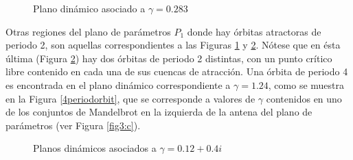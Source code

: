\begin{figure}[h!!!]
\begin{minipage}[m]{0.5\linewidth}
		\caption{Plano dinámico asociado a $\gamma=0.283$}\label{rightcircle}
	\end{minipage}
\end{figure}

Otras regiones del plano de parámetros $P_1$ donde hay órbitas atractoras de periodo 2, son aquellas correspondientes a las Figuras \ref{rightcircle} y \ref{circulocardioide}. Nótese que en ésta última (Figura \ref{circulocardioide}) hay dos órbitas de periodo 2 distintas, con un punto crítico libre contenido en cada una de sus cuencas de atracción. Una órbita de periodo 4 es encontrada en el plano dinámico correspondiente a $\gamma=1.24$, como se muestra en la Figura \ref{4periodorbit}, que se corresponde a valores de $\gamma$ contenidos en uno de los conjuntos de Mandelbrot en la izquierda de la antena del plano de parámetros (ver Figura \ref{fig3:c}).

\begin{figure}[h!]
	\caption{Planos dinámicos asociados a $\gamma=0.12+0.4i$}\label{circulocardioide}
\end{figure}


